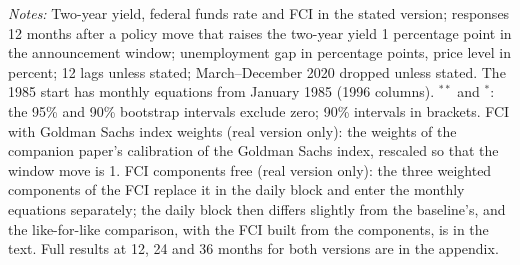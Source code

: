 \begin{table}[tp]
\begin{flushleft}\footnotesize\textit{Notes:} Two-year yield, federal funds rate and FCI in the stated version; responses 12 months after a policy move that raises the two-year yield 1 percentage point in the announcement window; unemployment gap in percentage points, price level in percent; 12 lags unless stated; March--December 2020 dropped unless stated. The 1985 start has monthly equations from January 1985 (1996 columns). $^{**}$ and $^{*}$: the 95\% and 90\% bootstrap intervals exclude zero; 90\% intervals in brackets. FCI with Goldman Sachs index weights (real version only): the weights of the companion paper's calibration of the Goldman Sachs index, rescaled so that the window move is 1. FCI components free (real version only): the three weighted components of the FCI replace it in the daily block and enter the monthly equations separately; the daily block then differs slightly from the baseline's, and the like-for-like comparison, with the FCI built from the components, is in the text. Full results at 12, 24 and 36 months for both versions are in the appendix.\end{flushleft}
\end{table}
